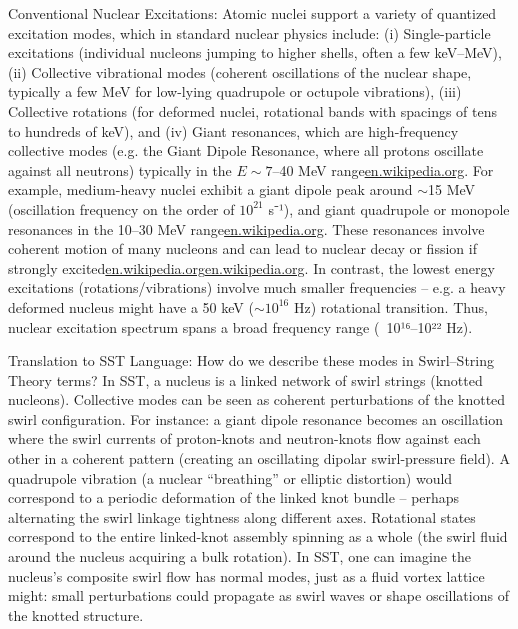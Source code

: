 \documentclass[11pt]{article}
\begin{document}
Conventional Nuclear Excitations: Atomic nuclei support a variety of quantized excitation modes, which in standard nuclear physics include: (i) Single-particle excitations (individual nucleons jumping to higher shells, often a few keV–MeV), (ii) Collective vibrational modes (coherent oscillations of the nuclear shape, typically a few MeV for low-lying quadrupole or octupole vibrations), (iii) Collective rotations (for deformed nuclei, rotational bands with spacings of tens to hundreds of keV), and (iv) Giant resonances, which are high-frequency collective modes (e.g. the Giant Dipole Resonance, where all protons oscillate against all neutrons) typically in the $E\sim7$–40 MeV range\href{https://en.wikipedia.org/wiki/Giant_resonance#:~:text=Giant%20dipole%20resonances%20can%20be,cause%20the%20average%20gamma%20decay}{en.wikipedia.org}. For example, medium-heavy nuclei exhibit a giant dipole peak around $\sim$15 MeV (oscillation frequency on the order of $10^{21}$ s⁻¹), and giant quadrupole or monopole resonances in the 10–30 MeV range\href{https://en.wikipedia.org/wiki/Giant_resonance#:~:text=Giant%20dipole%20resonances%20can%20be,cause%20the%20average%20gamma%20decay}{en.wikipedia.org}. These resonances involve coherent motion of many nucleons and can lead to nuclear decay or fission if strongly excited\href{https://en.wikipedia.org/wiki/Giant_resonance#:~:text=}{en.wikipedia.org}\href{https://en.wikipedia.org/wiki/Giant_resonance#:~:text=Giant%20dipole%20resonances%20can%20be,cause%20the%20average%20gamma%20decay}{en.wikipedia.org}. In contrast, the lowest energy excitations (rotations/vibrations) involve much smaller frequencies – e.g. a heavy deformed nucleus might have a 50 keV ($\sim10^{16}$ Hz) rotational transition. Thus, nuclear excitation spectrum spans a broad frequency range (~10¹⁶–10²² Hz).


Translation to SST Language: How do we describe these modes in Swirl–String Theory terms? In SST, a nucleus is a linked network of swirl strings (knotted nucleons). Collective modes can be seen as coherent perturbations of the knotted swirl configuration. For instance: a giant dipole resonance becomes an oscillation where the swirl currents of proton-knots and neutron-knots flow against each other in a coherent pattern (creating an oscillating dipolar swirl-pressure field). A quadrupole vibration (a nuclear “breathing” or elliptic distortion) would correspond to a periodic deformation of the linked knot bundle – perhaps alternating the swirl linkage tightness along different axes. Rotational states correspond to the entire linked-knot assembly spinning as a whole (the swirl fluid around the nucleus acquiring a bulk rotation). In SST, one can imagine the nucleus’s composite swirl flow has normal modes, just as a fluid vortex lattice might: small perturbations could propagate as swirl waves or shape oscillations of the knotted structure.
\end{document}
